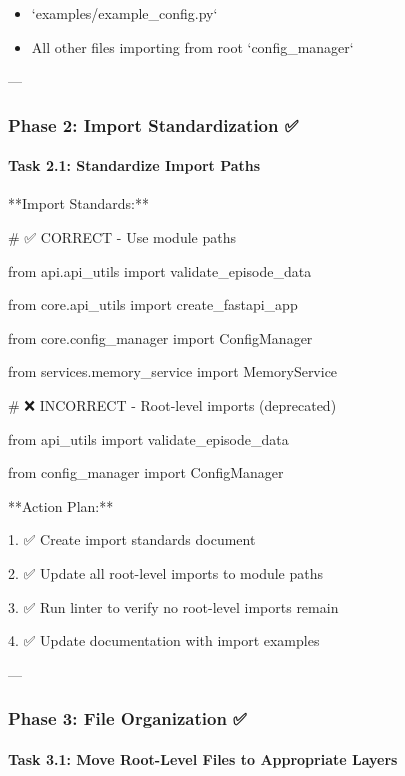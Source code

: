\documentclass[11pt,a4paper]{article}
\begin{document}
\begin{itemize}
\item `examples/example_config.py`
\end{itemize}

\begin{itemize}
\item All other files importing from root `config_manager`
\end{itemize}

---

\subsubsection{Phase 2: Import Standardization ✅}

\paragraph{Task 2.1: Standardize Import Paths}

**Import Standards:**

\# ✅ CORRECT - Use module paths

from api.api\_utils import validate\_episode\_data

from core.api\_utils import create\_fastapi\_app

from core.config\_manager import ConfigManager

from services.memory\_service import MemoryService

\# ❌ INCORRECT - Root-level imports (deprecated)

from api\_utils import validate\_episode\_data

from config\_manager import ConfigManager

**Action Plan:**

1. ✅ Create import standards document

2. ✅ Update all root-level imports to module paths

3. ✅ Run linter to verify no root-level imports remain

4. ✅ Update documentation with import examples

---

\subsubsection{Phase 3: File Organization ✅}

\paragraph{Task 3.1: Move Root-Level Files to Appropriate Layers}
\end{document}
